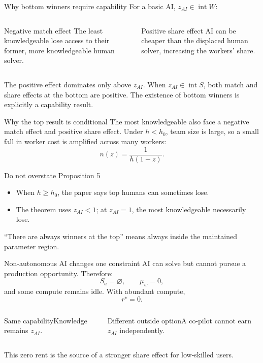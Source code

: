 \documentclass[aspectratio=169,10pt]{beamer}
\begin{document}
\begin{frame}{Why bottom winners require capability}
\small
For a basic AI, $z_{AI}\in\operatorname{int}W$:
\begin{columns}[T,onlytextwidth]
\begin{alertblock}{Negative match effect}
The least knowledgeable lose access to their former, more knowledgeable human solver.
\end{alertblock}
\begin{block}{Positive share effect}
AI can be cheaper than the displaced human solver, increasing the workers' share.
\end{block}
\end{columns}
\vspace{.3cm}
The positive effect dominates only above $\bar z_{AI}$. When $z_{AI}\in\operatorname{int}S$, both match and share effects at the bottom are positive.
\vfill
\centering{}\quad The existence of bottom winners is explicitly a capability result.
\end{frame}

\begin{frame}{Why the top result is conditional}
\small
The most knowledgeable also face a negative match effect and positive share effect. Under $h<h_0$, team size is large, so a small fall in worker cost is amplified across many workers:
\[
n(z)=\frac{1}{h(1-z)}.
\]
\begin{alertblock}{Do not overstate Proposition 5}
\begin{itemize}
\item When $h\ge h_0$, the paper says top humans can sometimes lose.
\item The theorem uses $z_{AI}<1$; at $z_{AI}=1$, the most knowledgeable necessarily lose.
\end{itemize}
\end{alertblock}
“There are always winners at the top” means always inside the maintained parameter region.
\end{frame}

\begin{frame}{Non-autonomous AI changes one constraint}
\small
AI can solve but cannot pursue a production opportunity. Therefore:
\[
S_a=\varnothing,\qquad \mu_w=0,
\]
and some compute remains idle. With abundant compute,
\[
\boxed{r^\star=0}.
\]
\begin{columns}[T,onlytextwidth]
\begin{block}{Same capability}Knowledge remains $z_{AI}$.\end{block}
\begin{alertblock}{Different outside option}A co-pilot cannot earn $z_{AI}$ independently.\end{alertblock}
\end{columns}
This zero rent is the source of a stronger share effect for low-skilled users.
\end{frame}
\end{document}
